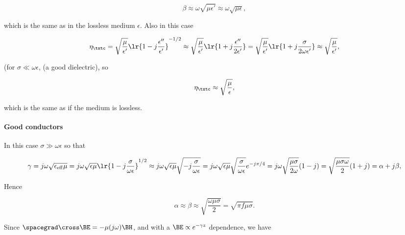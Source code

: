 \begin{dmath}\label{eqn:uwavesLecture3:360}
\beta
\approx
\omega \sqrt{\mu \epsilon'}
\approx
\omega \sqrt{\mu \epsilon},
\end{dmath}

which is the same as in the lossless medium \( \epsilon \).  Also in this case

\begin{dmath}\label{eqn:uwavesLecture3:380}
\eta_\txtc
=
\sqrt{\frac{\mu}{\epsilon'}} \lr{ 1 - j \frac{\epsilon''}{\epsilon'} }^{-1/2}
\approx
\sqrt{\frac{\mu}{\epsilon'}} \lr{ 1 + j \frac{\epsilon''}{2 \epsilon'} }
=
\sqrt{\frac{\mu}{\epsilon'}} \lr{ 1 + j \frac{\sigma}{2 \omega \epsilon'} }
\approx
\sqrt{\frac{\mu}{\epsilon'}},
\end{dmath}

(for \( \sigma \ll \omega \epsilon \), (a good dielectric), so

\begin{dmath}\label{eqn:uwavesLecture3:400}
\eta_\txtc \approx \sqrt{\frac{\mu}{\epsilon}},
\end{dmath}

which is the same as if the medium is lossless.

\paragraph{Good conductors}

In this case \( \sigma \gg \omega \epsilon \) so that

\begin{dmath}\label{eqn:uwavesLecture3:420}
\gamma
=
j \omega \sqrt{ \epsilon_{\mathrm{eff}} \mu }
=
j \omega \sqrt{ \epsilon \mu } \lr{ 1 - j \frac{\sigma}{\omega \epsilon} }^{1/2}
\approx
j \omega \sqrt{ \epsilon \mu } \sqrt{- j \frac{\sigma}{\omega \epsilon} }
=
j \omega \sqrt{ \epsilon \mu } \sqrt{\frac{\sigma}{\omega \epsilon} } e^{-j \pi/4}
=
j \omega \sqrt{ \frac{ \mu \sigma}{2 \omega} } ( 1 - j )
=
\sqrt{ \frac{ \mu \sigma \omega}{2 } } ( 1 + j )
= \alpha + j \beta,
\end{dmath}

Hence

\begin{equation}\label{eqn:uwavesLecture3:440}
\alpha \approx \beta \approx \sqrt{\frac{\omega \mu \sigma}{2}} = \sqrt{ \pi f \mu \sigma }.
\end{equation}

Since \( \spacegrad \cross \BE = - \mu (j \omega) \BH \), and with a \( \BE \propto e^{-\gamma z } \) dependence, we have

